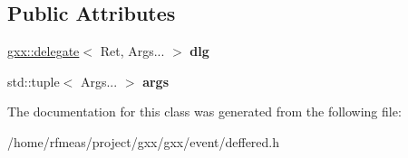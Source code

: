 \subsection*{Public Attributes}
\begin{DoxyCompactItemize}
\item 
\hyperlink{classgxx_1_1delegate}{gxx\+::delegate}$<$ Ret, Args... $>$ {\bfseries dlg}\hypertarget{classgxx_1_1deffered_ae53c058c74221d95cef72d4d49732603}{}\label{classgxx_1_1deffered_ae53c058c74221d95cef72d4d49732603}

\item 
std\+::tuple$<$ Args... $>$ {\bfseries args}\hypertarget{classgxx_1_1deffered_ae9951bf8d9eb1baca9b9da699f068fc5}{}\label{classgxx_1_1deffered_ae9951bf8d9eb1baca9b9da699f068fc5}

\end{DoxyCompactItemize}


The documentation for this class was generated from the following file\+:\begin{DoxyCompactItemize}
\item 
/home/rfmeas/project/gxx/gxx/event/deffered.\+h\end{DoxyCompactItemize}
